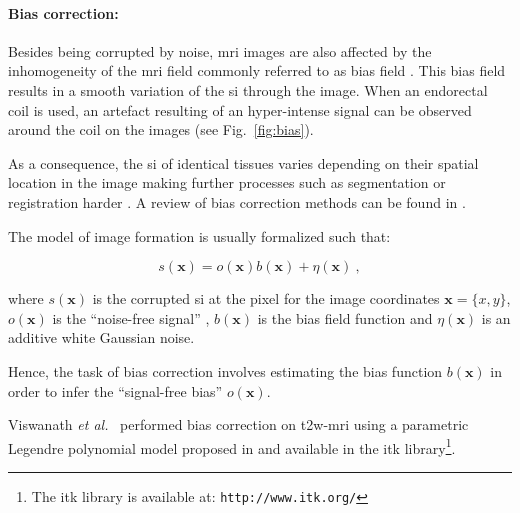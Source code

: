 \paragraph{Bias correction:} Besides being corrupted by noise, \ac{mri} images are also affected by the inhomogeneity of the \ac{mri} field commonly referred to as bias field \cite{Styner2000}.
This bias field results in a smooth variation of the \ac{si} through the image.
When an endorectal coil is used, an artefact resulting of an hyper-intense signal can be observed around the coil on the images (see Fig.~\ref{fig:bias}).

As a consequence, the \ac{si} of identical tissues varies depending on their spatial location in the image making further processes such as segmentation or registration harder \cite{Jungke1987,Vovk2007}.
A review of bias correction methods can be found in \cite{Vovk2007}.

{\color{blue}
The model of image formation is usually formalized such that:

\begin{equation}
	s(\mathbf{x}) = o(\mathbf{x})b(\mathbf{x}) + \eta(\mathbf{x}) \ ,
	\label{eq:biasmodel}
\end{equation}

\noindent where $s(\mathbf{x})$ is the corrupted \ac{si} at the pixel for the image coordinates $\mathbf{x} = \{x,y\}$, $o(\mathbf{x})$ is the ``noise-free signal'' , $b(\mathbf{x})$ is the bias field function and $\eta(\mathbf{x})$ is an additive white Gaussian noise.
%
%
%

Hence, the task of bias correction involves estimating the bias function $b(\mathbf{x})$ in order to infer the ``signal-free bias'' $o(\mathbf{x})$.
}

Viswanath \textit{et al.}~\cite{Viswanath2009} performed bias correction on \ac{t2w}-\ac{mri} using a parametric Legendre polynomial model proposed in \cite{Styner2000} and available in the \ac{itk} library\footnote{The \ac{itk} library is available at: \texttt{http://www.itk.org/}}.

